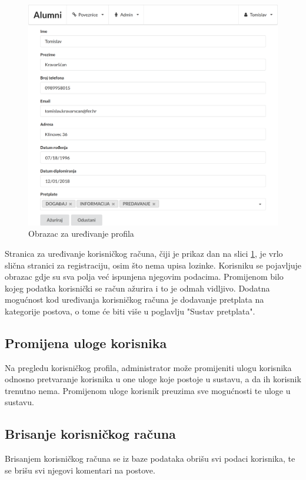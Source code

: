\documentclass[zavrsni, numeric]{fer}
\begin{document}
\begin{figure}[H]
	\centering
	\includegraphics[width=13cm]{slike/uredi-profil.png}
	\caption{Obrazac za uređivanje profila}
	\label{fig:uredi-profil}
\end{figure}

Stranica za uređivanje korisničkog računa, čiji je prikaz dan na slici \ref{fig:uredi-profil}, je vrlo slična stranici za registraciju, osim što nema upisa lozinke. Korisniku se pojavljuje obrazac gdje su sva polja već ispunjena njegovim podacima. Promijenom bilo kojeg podatka korisnički se račun ažurira i to je odmah vidljivo. Dodatna mogućnost kod uređivanja korisničkog računa je dodavanje pretplata na kategorije postova, o tome će biti više u poglavlju "Sustav pretplata".

\subsection{Promijena uloge korisnika}
Na pregledu korisničkog profila, administrator može promijeniti ulogu korisnika odnosno pretvaranje korisnika u one uloge koje postoje u sustavu, a da ih korisnik trenutno nema. Promijenom uloge korisnik preuzima sve mogućnosti te uloge u sustavu.

\subsection{Brisanje korisničkog računa}
Brisanjem korisničkog računa se iz baze podataka obrišu svi podaci korisnika, te se brišu svi njegovi komentari na postove.
\end{document}
